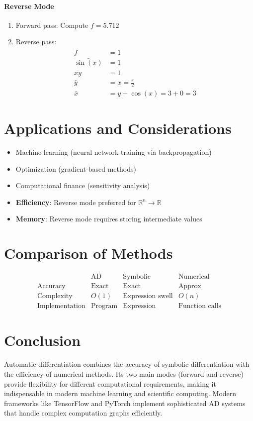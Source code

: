 \documentclass{article}
\begin{document}
\paragraph{Reverse Mode}
\begin{enumerate}
\item Forward pass: Compute $f = 5.712$
\item Reverse pass:
\begin{align*}
\bar{f} &= 1 \\
\bar{\sin(x)} &= 1 \\
\bar{xy} &= 1 \\
\bar{y} &= x = \frac{\pi}{2} \\
\bar{x} &= y + \cos(x) = 3 + 0 = 3
\end{align*}
\end{enumerate}

\section{Applications and Considerations}
\begin{itemize}
\item Machine learning (neural network training via backpropagation)
\item Optimization (gradient-based methods)
\item Computational finance (sensitivity analysis)
\item \textbf{Efficiency}: Reverse mode preferred for $\mathbb{R}^n \to \mathbb{R}$
\item \textbf{Memory}: Reverse mode requires storing intermediate values
\end{itemize}

\section{Comparison of Methods}
\[
\begin{array}{lccc}
& \text{AD} & \text{Symbolic} & \text{Numerical} \\
\text{Accuracy} & \text{Exact} & \text{Exact} & \text{Approx} \\
\text{Complexity} & O(1) & \text{Expression swell} & O(n) \\
\text{Implementation} & \text{Program} & \text{Expression} & \text{Function calls}
\end{array}
\]

\section{Conclusion}
Automatic differentiation combines the accuracy of symbolic differentiation with the efficiency of numerical methods. Its two main modes (forward and reverse) provide flexibility for different computational requirements, making it indispensable in modern machine learning and scientific computing. Modern frameworks like TensorFlow and PyTorch implement sophisticated AD systems that handle complex computation graphs efficiently.
\end{document}
